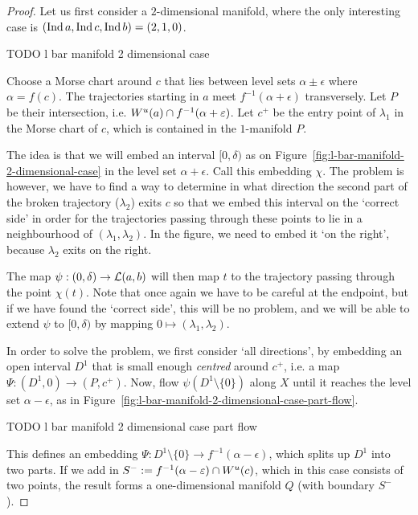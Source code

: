 \begin{proof}
    Let us first consider a $2$-dimensional manifold, where the only interesting case is $(\operatorname{Ind} a, \operatorname{Ind} c, \operatorname{Ind} b) = (2,1,0)$.

    \begin{marginfigure}
        \centering
        \caption{TODO l bar manifold 2 dimensional case}
        \label{fig:l-bar-manifold-2-dimensional-case}
    \end{marginfigure}
    Choose a Morse chart around $c$ that lies between level sets $\alpha \pm \epsilon$ where  $\alpha = f(c)$.
    The trajectories starting in $a$ meet $f^{-1}(\alpha + \epsilon)$ transversely.
    Let $P$ be their intersection, i.e. $W^u(a) \cap  f^{-1}( \alpha + \varepsilon)$.
    Let $c^{+}$ be the entry point of $\lambda_1$ in  the Morse chart of $c$, which is contained in the $1$-manifold $P$.

    The idea is that we will embed an interval $[0, \delta)$ as on Figure~\ref{fig:l-bar-manifold-2-dimensional-case} in the level set $\alpha + \epsilon$. Call this embedding $\chi$.
    The problem is however, we have to find a way to determine in what direction the second part of the broken trajectory ($\lambda_2$) exits $c$ so that we embed this interval on the `correct side' in order for the trajectories passing through these points to lie in a neighbourhood of $(\lambda_1, \lambda_2)$.
    In the figure, we need to embed it `on the right', because $\lambda_2$ exits on the right.

    The map $\psi:(0, \delta) \to  \mathcal L(a, b)$ will then map $t$ to the trajectory passing through the point $\chi(t)$.
    Note that once again we have to be careful at the endpoint, but if we have found the `correct side', this will be no problem, and we will be able to extend $\psi$ to $[0, \delta)$ by mapping  $0 \mapsto (\lambda_1, \lambda_2)$.

    In order to solve the problem, we first consider `all directions', by embedding an open interval $D^{1}$ that is small enough \emph{centred} around $c^{+}$, i.e. a map $\Psi: (D^{1}, 0) \to  (P, c^{+})$.
    Now, flow $\psi(D^{1} \setminus \{0\} )$ along $X$ until it reaches the level set $\alpha - \epsilon$, as in Figure~\ref{fig:l-bar-manifold-2-dimensional-case-part-flow}.
    \begin{marginfigure}
        \centering
        \caption{TODO l bar manifold 2 dimensional case part flow}
        \label{fig:l-bar-manifold-2-dimensional-case-part-flow}
    \end{marginfigure}
    This defines an embedding $\Psi: D^{1} \setminus \{0\} \to  f^{-1}(\alpha-\epsilon)$, which splits up $D^{1}$ into two parts.
    If we add in $S^{-} := f^{-1}(\alpha-\varepsilon) \cap W^u(c)$, which in this case consists of two points, the result forms a one-dimensional manifold $Q$ (with boundary $S^{-}$).


\end{proof}
